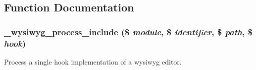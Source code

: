 \subsection{Function Documentation}
\hypertarget{group__wysiwyg__api_ga81487ce9ea49d7ca7b052bb8f2e8fcc8}{
\subsubsection[{\_\-wysiwyg\_\-process\_\-include}]{\setlength{\rightskip}{0pt plus 5cm}\_\-wysiwyg\_\-process\_\-include (\$ {\em module}, \/  \$ {\em identifier}, \/  \$ {\em path}, \/  \$ {\em hook})}}
\label{group__wysiwyg__api_ga81487ce9ea49d7ca7b052bb8f2e8fcc8}
Process a single hook implementation of a wysiwyg editor.


